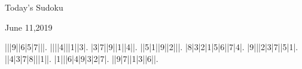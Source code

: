 \documentclass{article}
\begin{document}
\begin{center}
\Huge{Today's Sudoku}
\end{center}
\begin{center}
\Large{June 11,2019}
\end{center}
\begin{sudoku}
|||9||6|5|7|||.
||||4|||1||3|.
|3|7||9||1||4||.
||5|1||9||2|||.
|8|3|2|1|5|6||7|4|.
|9|||2|3|7||5|1|.
||4|3|7|8|||1||.
|1|||6|4|9|3|2|7|.
||9|7||1|3||6||.
\end{sudoku}
\end{document}
